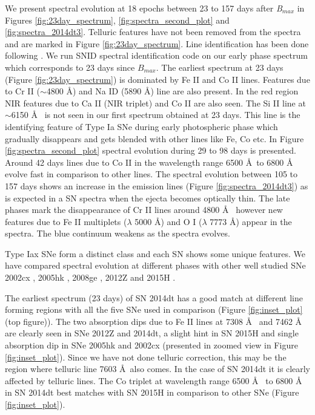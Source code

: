 \documentclass[fleqn,usenatbib]{mnras}
\begin{document}
We present spectral evolution at 18 epochs between 23 to 157 days after {\it B}$_{max}$ in Figures \ref{fig:23day_spectrum}, \ref{fig:spectra_second_plot} and \ref{fig:spectra_2014dt3}. Telluric features have not been removed from the spectra and are marked in Figure \ref{fig:23day_spectrum}. Line identification has been done following \cite{2004PASP..116..903B}. We run SNID \citep{2007ApJ...666.1024B} spectral identification code on our early phase spectrum which corresponds to 23 days since $B$$_{max}$. The earliest spectrum at 23 days (Figure \ref{fig:23day_spectrum}) is dominated by Fe II and Co II lines. Features due to Cr II ($\sim$4800 \AA) and Na ID (5890 \AA) line are also present. In the red region NIR features due to Ca II (NIR triplet) and Co II are also seen. The Si II line at $\sim$6150 \AA~ is not seen in our first spectrum obtained at 23 days. This line is the identifying feature of Type Ia SNe during early photospheric phase which gradually disappears and gets blended with other lines like Fe, Co etc. In Figure \ref{fig:spectra_second_plot} spectral evolution during 29 to 98 days is presented. Around 42 days lines due to Co II in the wavelength range 6500 \AA~to 6800 \AA~ evolve fast in comparison to other lines. The spectral evolution between 105 to 157 days shows an increase in the emission lines (Figure \ref{fig:spectra_2014dt3}) as is expected in a SN spectra when the ejecta becomes optically thin. The late phases mark the disappearance of Cr II lines around 4800 \AA~ however new features due to Fe II multiplets ($\lambda$ 5000 \AA) and O I ($\lambda$ 7773 \AA) appear in the spectra. The blue continuum weakens as the spectra evolves.  


Type Iax SNe form a distinct class and each SN shows some unique features. We have compared spectral evolution at different phases with other well studied SNe 2002cx \citep{2003PASP..115..453L}, 2005hk \citep{2008ApJ...680..580S}, {2008ge \citep{2010AJ....140.1321F}}, 2012Z \citep{2015A&A...573A...2S} and 2015H \citep{2016A&A...589A..89M}. 

The earliest spectrum (23 days) of SN 2014dt has a good match at different line forming regions with all the five SNe used in comparison (Figure \ref{fig:inset_plot} (top figure)). The two absorption dips due to Fe II lines at 7308 \AA~ and 7462 \AA~ are clearly seen in SNe 2012Z and 2014dt, a slight hint in SN 2015H and single absorption dip in SNe 2005hk and 2002cx (presented in zoomed view in Figure \ref{fig:inset_plot}). Since we have not done telluric correction, this may be the region where telluric line 7603 \AA~also comes. In the case of SN 2014dt it is clearly affected by telluric lines. The Co triplet at wavelength range 6500 \AA~ to 6800 \AA~ in SN 2014dt best matches with SN 2015H in comparison to other SNe (Figure \ref{fig:inset_plot}).
\end{document}
